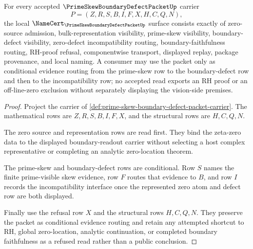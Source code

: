 \begin{theorem}
\label{thm:rh-prime-skew-boundary-defect-packet}
For every accepted $\PrimeSkewBoundaryDefectPacketUp$ carrier
$$
P=(Z,R,S,B,I,F,X,H,C,Q,N),
$$
the local $\NameCert_{\PrimeSkewBoundaryDefectPacketUp}$ surface consists exactly of zero-source admission, bulk-representation visibility, prime-skew visibility, boundary-defect visibility, zero-defect incompatibility routing, boundary-faithfulness routing, RH-proof refusal, componentwise transport, displayed replay, package provenance, and local naming. A consumer may use the packet only as conditional evidence routing from the prime-skew row to the boundary-defect row and then to the incompatibility row; no accepted read exports an RH proof or an off-line-zero exclusion without separately displaying the vision-side premises.
\end{theorem}
\begin{proof}
Project the carrier of \autoref{def:prime-skew-boundary-defect-packet-carrier}. The mathematical rows are $Z,R,S,B,I,F,X$, and the structural rows are $H,C,Q,N$.

The zero source and representation rows are read first. They bind the zeta-zero data to the displayed boundary-readout carrier without selecting a host complex representative or completing an analytic zero-location theorem.

The prime-skew and boundary-defect rows are conditional. Row $S$ names the finite prime-visible skew evidence, row $F$ routes that evidence to $B$, and row $I$ records the incompatibility interface once the represented zero atom and defect row are both displayed.

Finally use the refusal row $X$ and the structural rows $H,C,Q,N$. They preserve the packet as conditional evidence routing and retain any attempted shortcut to RH, global zero-location, analytic continuation, or completed boundary faithfulness as a refused read rather than a public conclusion.
\end{proof}

